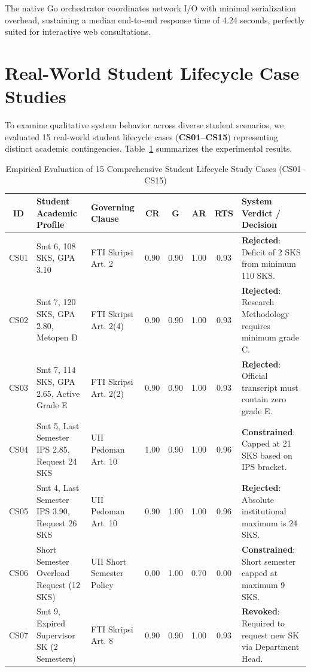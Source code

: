 \documentclass[conference]{IEEEtran}
\begin{document}
The native Go orchestrator coordinates network I/O with minimal serialization overhead, sustaining a median end-to-end response time of 4.24 seconds, perfectly suited for interactive web consultations.

\section{Real-World Student Lifecycle Case Studies}
To examine qualitative system behavior across diverse student scenarios, we evaluated 15 real-world student lifecycle cases (\textbf{CS01–CS15}) representing distinct academic contingencies. Table~\ref{tab:studycases} summarizes the experimental results.

\begin{table}[htbp]
\caption{Empirical Evaluation of 15 Comprehensive Student Lifecycle Study Cases (CS01--CS15)}
\label{tab:studycases}
\centering
\footnotesize
\begin{tabularx}{\textwidth}{c p{3.8cm} p{3.5cm} cccc X}
\toprule
\textbf{ID} & \textbf{Student Academic Profile} & \textbf{Governing Clause} & \textbf{CR} & \textbf{G} & \textbf{AR} & \textbf{RTS} & \textbf{System Verdict / Decision} \\
\midrule
CS01 & Smt 6, 108 SKS, GPA 3.10 & FTI Skripsi Art. 2 & 0.90 & 0.90 & 1.00 & 0.93 & \textbf{Rejected}: Deficit of 2 SKS from minimum 110 SKS. \\
CS02 & Smt 7, 120 SKS, GPA 2.80, Metopen D & FTI Skripsi Art. 2(4) & 0.90 & 0.90 & 1.00 & 0.93 & \textbf{Rejected}: Research Methodology requires minimum grade C. \\
CS03 & Smt 7, 114 SKS, GPA 2.65, Active Grade E & FTI Skripsi Art. 2(2) & 0.90 & 0.90 & 1.00 & 0.93 & \textbf{Rejected}: Official transcript must contain zero grade E. \\
CS04 & Smt 5, Last Semester IPS 2.85, Request 24 SKS & UII Pedoman Art. 10 & 1.00 & 0.90 & 1.00 & 0.96 & \textbf{Constrained}: Capped at 21 SKS based on IPS bracket. \\
CS05 & Smt 4, Last Semester IPS 3.90, Request 26 SKS & UII Pedoman Art. 10 & 0.90 & 1.00 & 1.00 & 0.96 & \textbf{Rejected}: Absolute institutional maximum is 24 SKS. \\
CS06 & Short Semester Overload Request (12 SKS) & UII Short Semester Policy & 0.00 & 1.00 & 0.70 & 0.00 & \textbf{Constrained}: Short semester capped at maximum 9 SKS. \\
CS07 & Smt 9, Expired Supervisor SK (2 Semesters) & FTI Skripsi Art. 8 & 0.90 & 0.90 & 1.00 & 0.93 & \textbf{Revoked}: Required to request new SK via Department Head. \\

\end{tabularx}
\end{table}
\end{document}
